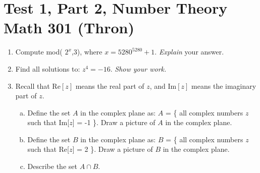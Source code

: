 \chapter{Test 1, Part 2, Number Theory Math 301 (Thron) }\label{Actual}

\begin{enumerate}[(1)]


\item
Compute mod( $2^{x}$,3), where $x = 5280^{5280}+1$. \emph{Explain} your answer. 

\item
Find all solutions to: $z^4 = -16$.  \emph{Show your work.}


\item
Recall that $\textrm{Re}[z]$ means the real part of $z$, and  $\textrm{Im}[z]$ means the imaginary part of $z$.
\begin{enumerate}[(a)]
\item
Define the set $A$ in the complex plane as:    $A$ = \{ all complex numbers  $z$ such that Im[$z$]  = -1 \}.  Draw a picture of $A$ in the complex plane.
\item
Define the set $B$ in the complex plane as:    $B$ = \{ all complex numbers  $z$ such that Re[$z$]  = 2 \}.  Draw a picture of $B$ in the complex plane.
\item Describe the set $A \cap B$.
\end{enumerate}






\end{enumerate}